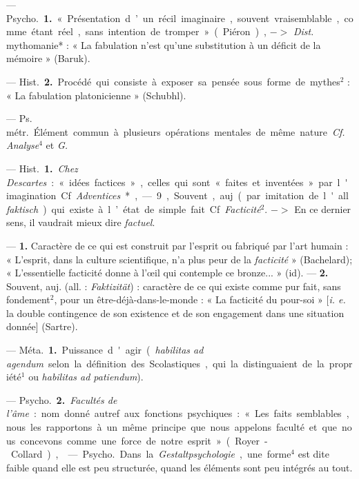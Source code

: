
	\begin{itemize}[leftmargin=1cm, label=, itemsep=1pt]

 — \si{Psycho.} {\bf 1.} « Présentation d’un récil imaginaire, souvent vraisemblable, comme étant
réel, sans intention de tromper »
(Piéron), $->$ {\it Dist.} mythomanie* :
« La fabulation n’est qu’une substitution à un déficit de la mémoire »
(Baruk).

— \si{Hist.} {\bf 2.} Procédé qui consiste
à exposer sa pensée sous forme de
mythes$^2$ : « La fabulation platonicienne » (Schubhl).

 — \si{Ps. métr.} Élément commun
à plusieurs opérations mentales de
même nature. {\it Cf.} {\it Analyse}$^4$ et {\it G.}

 — \si{Hist.} {\bf 1.} {\it Chez Descartes} :
« idées factices », celles qui sont
« faites et inventées » par l'imagination. Cf. {\it Adventices}*, — 9, Souvent, auj. (par imitation de l'all.
{\it faktisch}) qui existe à l’état de
simple fait. Cf. {\it Facticité}$^2$. $->$ En
ce dernier sens, il vaudrait mieux dire {\it factuel}.

 — {\bf 1.} Caractère de ce qui est construit par l'esprit ou 
fabriqué par l'art humain : « L'esprit, dans la culture scientifique, n’a
plus peur de la {\it facticité} » (Bachelard); « L’essentielle facticité
donne à l’œil qui contemple ce bronze... » (id). —
 {\bf 2.} Souvent, auj. (all. : {\it Faktizität}) :
caractère de ce qui existe comme pur fait, sans fondement$^2$, pour un
être-déjà-dans-le-monde : « La facticité du pour-soi » [{\it i. e.} la double
contingence de son existence et de son engagement dans une situation
donnée] (Sartre).

 — \si{Méta.} {\bf 1.} Puissance d'agir
({\it habilitas ad agendum} selon la définition des Scolastiques, qui la distinguaient de la propriété$^1$ ou {\it habilitas ad patiendum}).

— \si{Psycho.} {\bf 2.} {\it Facultés de l'âme} : nom donné autref. aux
fonctions psychiques : « Les faits semblables, nous les rapportons à un même
principe que nous appelons faculté et que nous concevons comme une force
de notre esprit » (Royer-Collard),

 — \si{Psycho.} Dans la {\it Gestaltpsychologie}, une forme$^4$
est dite faible quand elle est peu structurée,
quand les éléments sont peu intégrés au tout.


\end{itemize}
